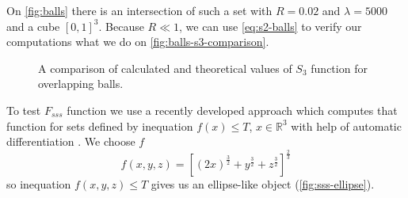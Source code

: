 \documentclass[1p]{elsarticle}
\begin{document}
On \cref{fig:balls} there is an intersection of such a set with $R = 0.02$ and
$\lambda=5000$ and a cube $[0, 1]^3$. Because $R \ll 1$, we can use
\cref{eq:s2-balls} to verify our computations what we do on
\cref{fig:balls-s3-comparison}.
\begin{figure}[tp]
  \centering
  \hfill
  \caption[]{A comparison of calculated and theoretical values of $S_3$ function
    for overlapping balls.}
  \label{fig:s3-verification}
\end{figure}

To test $F_{sss}$ function we use a recently developed approach which computes
that function for sets defined by inequation $f(x) \le T$, $x \in \mathbb{R}^3$
with help of automatic differentiation \cite{postnicov20232}. We choose $f$
\begin{equation}
  f(x, y, z) = [(2x)^{\frac{3}{2}} + y^{\frac{3}{2}} + z^{\frac{3}{2}}]^{\frac{2}{3}}
\end{equation}
so inequation $f(x, y, z) \le T$ gives us an ellipse-like object
(\cref{fig:sss-ellipse}).
\end{document}
